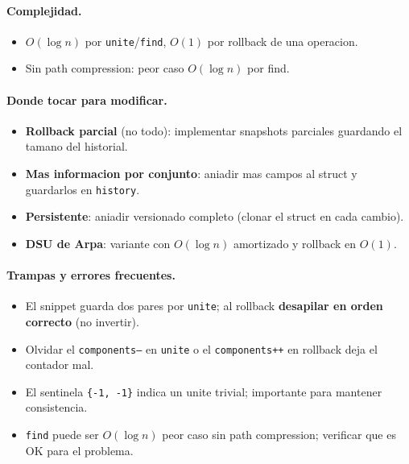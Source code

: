 \paragraph{Complejidad.}
\begin{itemize}\setlength\itemsep{0pt}
	\item $O(\log n)$ por \texttt{unite}/\texttt{find}, $O(1)$ por rollback de una operacion.
	\item Sin path compression: peor caso $O(\log n)$ por find.
\end{itemize}

\paragraph{Donde tocar para modificar.}
\begin{itemize}\setlength\itemsep{0pt}
	\item \textbf{Rollback parcial} (no todo): implementar snapshots parciales guardando el tamano del historial.
	\item \textbf{Mas informacion por conjunto}: aniadir mas campos al struct y guardarlos en \texttt{history}.
	\item \textbf{Persistente}: aniadir versionado completo (clonar el struct en cada cambio).
	\item \textbf{DSU de Arpa}: variante con $O(\log n)$ amortizado y rollback en $O(1)$.
\end{itemize}

\paragraph{Trampas y errores frecuentes.}
\begin{itemize}\setlength\itemsep{0pt}
	\item El snippet guarda dos pares por \texttt{unite}; al rollback \textbf{desapilar en orden correcto} (no invertir).
	\item Olvidar el \texttt{components--} en \texttt{unite} o el \texttt{components++} en rollback deja el contador mal.
	\item El sentinela \texttt{\{-1, -1\}} indica un unite trivial; importante para mantener consistencia.
	\item \texttt{find} puede ser $O(\log n)$ peor caso sin path compression; verificar que es OK para el problema.
\end{itemize}

